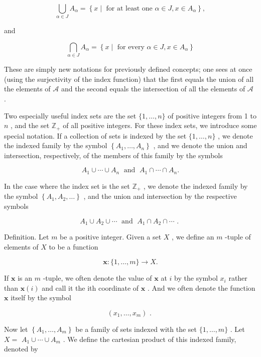 \[
\mathop{\bigcup }\limits_{{\alpha  \in  J}}{A}_{\alpha } = \left\{  {x \mid  \text{ for at least one }\alpha  \in  J,x \in  {A}_{\alpha }}\right\}  ,
\]

and

\[
\mathop{\bigcap }\limits_{{\alpha  \in  J}}{A}_{\alpha } = \left\{  {x \mid  \text{ for every }\alpha  \in  J,x \in  {A}_{\alpha }}\right\}
\]

These are simply new notations for previously defined concepts; one sees at once (using the surjectivity of the index function) that the first equals the union of all the elements of \(\mathcal{A}\) and the second equals the intersection of all the elements of \(\mathcal{A}\) .

Two especially useful index sets are the set \(\{ 1,\ldots ,n\}\) of positive integers from 1 to \(n\) , and the set \({\mathbb{Z}}_{ + }\) of all positive integers. For these index sets, we introduce some special notation. If a collection of sets is indexed by the set \(\{ 1,\ldots ,n\}\) , we denote the indexed family by the symbol \(\left\{  {{A}_{1},\ldots ,{A}_{n}}\right\}\) , and we denote the union and intersection, respectively, of the members of this family by the symbols

\[
{A}_{1} \cup  \cdots  \cup  {A}_{n}\;\text{ and }\;{A}_{1} \cap  \cdots  \cap  {A}_{n}.
\]

In the case where the index set is the set \({\mathbb{Z}}_{ + }\) , we denote the indexed family by the symbol \(\left\{  {{A}_{1},{A}_{2},\ldots }\right\}\) , and the union and intersection by the respective symbols

\[
{A}_{1} \cup  {A}_{2} \cup  \cdots \;\text{ and }\;{A}_{1} \cap  {A}_{2} \cap  \cdots \text{ . }
\]

Definition. Let \(m\) be a positive integer. Given a set \(X\) , we define an \(m\) -tuple of elements of \(X\) to be a function

\[
\mathbf{x} : \{ 1,\ldots ,m\}  \rightarrow  X.
\]

If \(\mathbf{x}\) is an \(m\) -tuple, we often denote the value of \(\mathbf{x}\) at \(i\) by the symbol \({x}_{i}\) rather than \(\mathbf{x}\left( i\right)\) and call it the ith coordinate of \(\mathbf{x}\) . And we often denote the function \(\mathbf{x}\) itself by the symbol

\[
\left( {{x}_{1},\ldots ,{x}_{m}}\right) \text{ . }
\]

Now let \(\left\{  {{A}_{1},\ldots ,{A}_{m}}\right\}\) be a family of sets indexed with the set \(\{ 1,\ldots ,m\}\) . Let \(X =\)  \({A}_{1} \cup  \cdots  \cup  {A}_{m}\) . We define the cartesian product of this indexed family, denoted by

